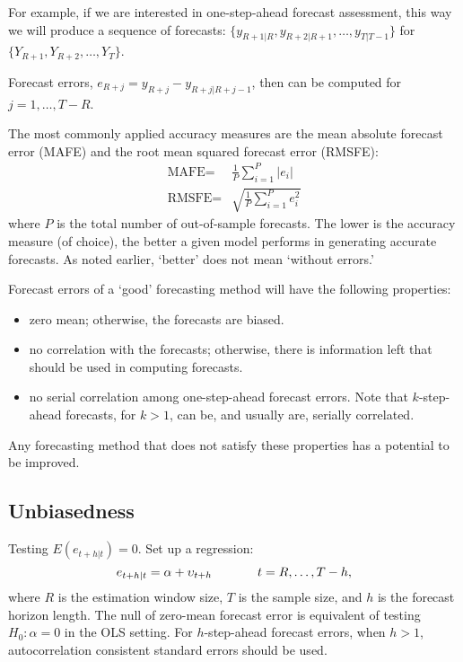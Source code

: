 \documentclass[
  oneside]{book}
\providecommand{\tightlist}{%
  \setlength{\itemsep}{0pt}\setlength{\parskip}{0pt}}
\begin{document}
For example, if we are interested in one-step-ahead forecast assessment, this way we will produce a sequence of forecasts: \(\{y_{R+1|R},y_{R+2|{R+1}},\ldots,y_{T|{T-1}}\}\) for \(\{Y_{R+1},Y_{R+2},\ldots,Y_{T}\}\).

Forecast errors, \(e_{R+j} = y_{R+j} - y_{R+j|{R+j-1}}\), then can be computed for \(j = 1,\ldots,T-R\).

The most commonly applied accuracy measures are the mean absolute forecast error (MAFE) and the root mean squared forecast error (RMSFE):
\[\begin{aligned}
\text{MAFE}  = & \frac{1}{P}\sum_{i=1}^{P}|e_i|\\
\text{RMSFE} = & \sqrt{\frac{1}{P}\sum_{i=1}^{P}e_i^2}
\end{aligned}\]
where \(P\) is the total number of out-of-sample forecasts. The lower is the accuracy measure (of choice), the better a given model performs in generating accurate forecasts. As noted earlier, `better' does not mean `without errors.'

Forecast errors of a `good' forecasting method will have the following properties:

\begin{itemize}
\tightlist
\item
  zero mean; otherwise, the forecasts are biased.
\item
  no correlation with the forecasts; otherwise, there is information left that should be used in computing forecasts.
\item
  no serial correlation among one-step-ahead forecast errors. Note that \(k\)-step-ahead forecasts, for \(k>1\), can be, and usually are, serially correlated.
\end{itemize}

Any forecasting method that does not satisfy these properties has a potential to be improved.

\hypertarget{unbiasedness}{%
\subsection{Unbiasedness}\label{unbiasedness}}

Testing \(E(e_{t+h|t})=0\). Set up a regression: \[e_{t+h|t} = \alpha+\upsilon_{t+h} \hspace{.5in} t = R,\ldots,T-h,\]
where \(R\) is the estimation window size, \(T\) is the sample size, and \(h\) is the forecast horizon length. The null of zero-mean forecast error is equivalent of testing \(H_0: \alpha = 0\) in the OLS setting. For \(h\)-step-ahead forecast errors, when \(h>1\), autocorrelation consistent standard errors should be used.
\end{document}
